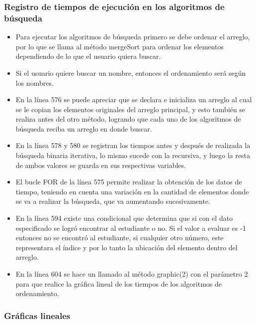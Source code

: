 \documentclass{article}
\begin{document}
    \subsubsection{Registro de tiempos de ejecución en los algoritmos de búsqueda}
    
    
	
	\begin{itemize}	
		\item Para ejecutar los algoritmos de búsqueda primero se debe ordenar el arreglo, por lo que se llama al método mergeSort para ordenar los elementos dependiendo de lo que el usuario quiera buscar.
        \item Si el usuario quiere buscar un nombre, entonces el ordenamiento será según los nombres.
        \item En la línea 576 se puede apreciar que se declara e inicializa un arreglo al cual se le copian los elementos originales del arreglo principal, y esto también se realiza antes del otro método, logrando que cada uno de los algoritmos de búsqueda reciba un arreglo en donde buscar.
        \item En la línea 578 y 580 se registran los tiempos antes y después de realizada la búsqueda binaria iterativa, lo mismo sucede con la recursiva, y luego la resta de ambos valores se guarda en sus respectivas variables.
        \item El bucle FOR de la línea 575 permite realizar la obtención de los datos de tiempo, teniendo en cuenta una variación en la cantidad de elementos donde se va a realizar la búsqueda, que va aumentando sucesivamente.
        \item En la línea 594 existe una condicional que determina que si con el dato especificado se logró encontrar al estudiante o no. Si el valor a evaluar es -1 entonces no se encontró al estudiante, si cualquier otro número, este representara el índice y por lo tanto la ubicación del elemento dentro del arreglo.
        \item En la línea 604 se hace un llamado al método graphic(2) con el parámetro 2 para que realice la gráfica lineal de los tiempos de los algoritmos de ordenamiento.
	\end{itemize}

    \subsubsection{Gráficas lineales}
    
\end{document}
